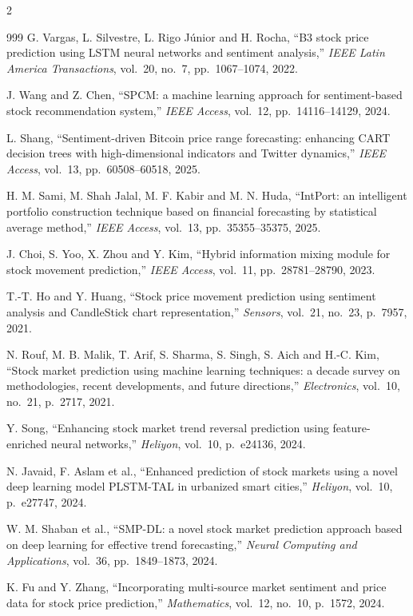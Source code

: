 \begin{footnotesize}
\begin{multicols}{2}
\begin{thebibliography}{999}
 G. Vargas, L. Silvestre, L. Rigo J\'unior and H. Rocha, ``B3 stock price
prediction using LSTM neural networks and sentiment analysis,'' \emph{IEEE Latin America
Transactions}, vol.~20, no.~7, pp.~1067--1074, 2022.

 J. Wang and Z. Chen, ``SPCM: a machine learning approach for
sentiment-based stock recommendation system,'' \emph{IEEE Access}, vol.~12, pp.~14116--14129,
2024.

 L. Shang, ``Sentiment-driven Bitcoin price range forecasting: enhancing
CART decision trees with high-dimensional indicators and Twitter dynamics,'' \emph{IEEE
Access}, vol.~13, pp.~60508--60518, 2025.

 H. M. Sami, M. Shah Jalal, M. F. Kabir and M. N. Huda, ``IntPort: an
intelligent portfolio construction technique based on financial forecasting by statistical
average method,'' \emph{IEEE Access}, vol.~13, pp.~35355--35375, 2025.

 J. Choi, S. Yoo, X. Zhou and Y. Kim, ``Hybrid information mixing module for
stock movement prediction,'' \emph{IEEE Access}, vol.~11, pp.~28781--28790, 2023.

 T.-T. Ho and Y. Huang, ``Stock price movement prediction using sentiment
analysis and CandleStick chart representation,'' \emph{Sensors}, vol.~21, no.~23, p.~7957,
2021.

 N. Rouf, M. B. Malik, T. Arif, S. Sharma, S. Singh, S. Aich and H.-C. Kim,
``Stock market prediction using machine learning techniques: a decade survey on
methodologies, recent developments, and future directions,'' \emph{Electronics}, vol.~10,
no.~21, p.~2717, 2021.

 Y. Song, ``Enhancing stock market trend reversal prediction using
feature-enriched neural networks,'' \emph{Heliyon}, vol.~10, p.~e24136, 2024.

 N. Javaid, F. Aslam et al., ``Enhanced prediction of stock markets using
a novel deep learning model PLSTM-TAL in urbanized smart cities,'' \emph{Heliyon}, vol.~10,
p.~e27747, 2024.

 W. M. Shaban et al., ``SMP-DL: a novel stock market prediction approach
based on deep learning for effective trend forecasting,'' \emph{Neural Computing and
Applications}, vol.~36, pp.~1849--1873, 2024.

 K. Fu and Y. Zhang, ``Incorporating multi-source market sentiment and price
data for stock price prediction,'' \emph{Mathematics}, vol.~12, no.~10, p.~1572, 2024.


\end{thebibliography}
\end{multicols}
\end{footnotesize}
